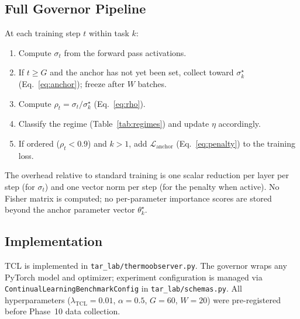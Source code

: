 \subsection{Full Governor Pipeline}

At each training step $t$ within task $k$:
\begin{enumerate}
    \item Compute $\sigma_t$ from the forward pass activations.
    \item If $t \geq G$ and the anchor has not yet been set, collect toward $\sigma^\star_k$
          (Eq.~\ref{eq:anchor}); freeze after $W$ batches.
    \item Compute $\rho_t = \sigma_t / \sigma^\star_k$ (Eq.~\ref{eq:rho}).
    \item Classify the regime (Table~\ref{tab:regimes}) and update $\eta$ accordingly.
    \item If ordered ($\rho_t < 0.9$) and $k > 1$, add $\mathcal{L}_{\text{anchor}}$
          (Eq.~\ref{eq:penalty}) to the training loss.
\end{enumerate}
The overhead relative to standard training is one scalar reduction per layer per step
(for $\sigma_t$) and one vector norm per step (for the penalty when active).
No Fisher matrix is computed; no per-parameter importance scores are stored beyond
the anchor parameter vector $\theta^\star_k$.

\subsection{Implementation}

TCL is implemented in \texttt{tar\_lab/thermoobserver.py}.
The governor wraps any PyTorch model and optimizer; experiment configuration is
managed via \texttt{ContinualLearningBenchmarkConfig} in \texttt{tar\_lab/schemas.py}.
All hyperparameters ($\lambda_{\text{TCL}} = 0.01$, $\alpha = 0.5$, $G = 60$,
$W = 20$) were pre-registered before Phase~10 data collection.
